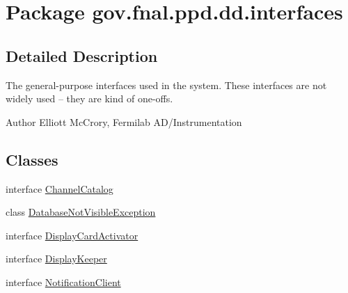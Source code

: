 \hypertarget{namespacegov_1_1fnal_1_1ppd_1_1dd_1_1interfaces}{\section{Package gov.\-fnal.\-ppd.\-dd.\-interfaces}
\label{namespacegov_1_1fnal_1_1ppd_1_1dd_1_1interfaces}
}


\subsection{Detailed Description}
The general-\/purpose interfaces used in the system. These interfaces are not widely used -- they are kind of one-\/offs.

\begin{DoxyAuthor}{Author}
Elliott Mc\-Crory, Fermilab A\-D/\-Instrumentation 
\end{DoxyAuthor}
\subsection*{Classes}
\begin{DoxyCompactItemize}
\item 
interface \hyperlink{interfacegov_1_1fnal_1_1ppd_1_1dd_1_1interfaces_1_1ChannelCatalog}{Channel\-Catalog}
\item 
class \hyperlink{classgov_1_1fnal_1_1ppd_1_1dd_1_1interfaces_1_1DatabaseNotVisibleException}{Database\-Not\-Visible\-Exception}
\item 
interface \hyperlink{interfacegov_1_1fnal_1_1ppd_1_1dd_1_1interfaces_1_1DisplayCardActivator}{Display\-Card\-Activator}
\item 
interface \hyperlink{interfacegov_1_1fnal_1_1ppd_1_1dd_1_1interfaces_1_1DisplayKeeper}{Display\-Keeper}
\item 
interface \hyperlink{interfacegov_1_1fnal_1_1ppd_1_1dd_1_1interfaces_1_1NotificationClient}{Notification\-Client}
\end{DoxyCompactItemize}
